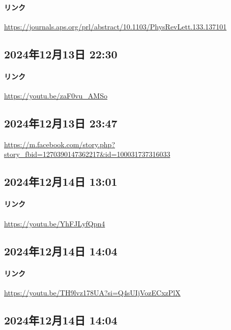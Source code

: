 \paragraph{リンク}
\url{https://journals.aps.org/prl/abstract/10.1103/PhysRevLett.133.137101}

\subsection*{2024年12月13日 22:30}

\paragraph{リンク}
\url{https://youtu.be/zaF0vu_AMSo}

\subsection*{2024年12月13日 23:47}

\url{https://m.facebook.com/story.php?story_fbid=1270390147362217&id=100031737316033}

\subsection*{2024年12月14日 13:01}

\paragraph{リンク}
\url{https://youtu.be/YhFJLyfQpn4}

\subsection*{2024年12月14日 14:04}

\paragraph{リンク}
\url{https://youtu.be/TH9lvz178UA?si=Q4sUIjVozECxzPlX}

\subsection*{2024年12月14日 14:04}


